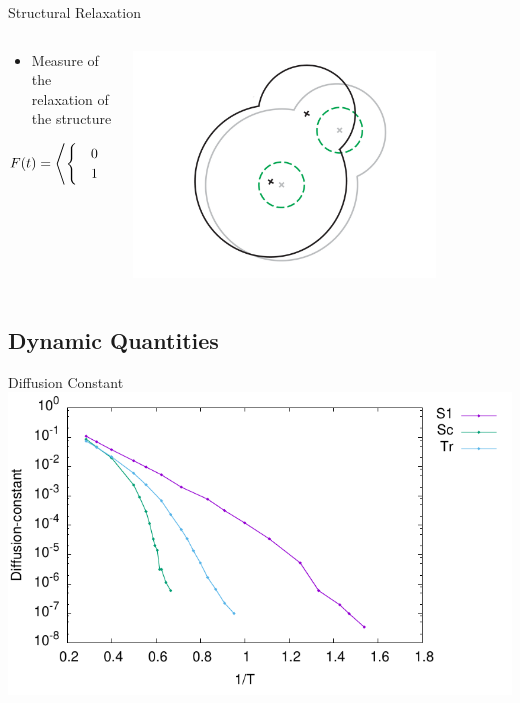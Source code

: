 \documentclass[16pt, aspectratio=43,compress]{beamer}
\begin{document}
\begin{frame}{Structural Relaxation}
    \begin{columns}
        \begin{column}{0.5\linewidth}
            \begin{itemize}
                \item Measure of the relaxation of the structure
            \end{itemize}
            \begin{align*}
                  F(t) = \left \langle \begin{cases}
                        \quad0 &\text{if } \Delta \mathbf{r} > 0.3 \\
                        \quad1 &\text{if } \Delta \mathbf{r} \leq 0.3
                  \end{cases} \quad \right \rangle
            \end{align*}
        \end{column}
        \begin{column}{0.5\linewidth}
            \centering
            \includegraphics[width=0.8\textwidth]{struct}
        \end{column}
    \end{columns}
\end{frame}

\subsection{Dynamic Quantities}

\begin{frame}{Diffusion Constant}
    \centering
    \includegraphics[width=\textwidth]{Diffusion-constant}
\end{frame}
\end{document}
